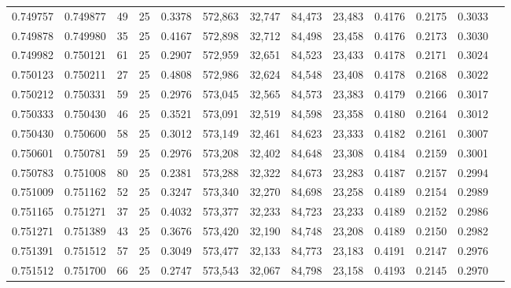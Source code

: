 \begin{tabular}{rrrrrrrrrrrrr}
0.749757 & 0.749877 &    49 &  25 &                                     0.3378 & 572,863 &  32,747 &  84,473 &  23,483 & 0.4176 & 0.2175 & 0.3033 \\
0.749878 & 0.749980 &    35 &  25 &                                     0.4167 & 572,898 &  32,712 &  84,498 &  23,458 & 0.4176 & 0.2173 & 0.3030 \\
0.749982 & 0.750121 &    61 &  25 &                                     0.2907 & 572,959 &  32,651 &  84,523 &  23,433 & 0.4178 & 0.2171 & 0.3024 \\
0.750123 & 0.750211 &    27 &  25 &                                     0.4808 & 572,986 &  32,624 &  84,548 &  23,408 & 0.4178 & 0.2168 & 0.3022 \\
0.750212 & 0.750331 &    59 &  25 &                                     0.2976 & 573,045 &  32,565 &  84,573 &  23,383 & 0.4179 & 0.2166 & 0.3017 \\
0.750333 & 0.750430 &    46 &  25 &                                     0.3521 & 573,091 &  32,519 &  84,598 &  23,358 & 0.4180 & 0.2164 & 0.3012 \\
0.750430 & 0.750600 &    58 &  25 &                                     0.3012 & 573,149 &  32,461 &  84,623 &  23,333 & 0.4182 & 0.2161 & 0.3007 \\
0.750601 & 0.750781 &    59 &  25 &                                     0.2976 & 573,208 &  32,402 &  84,648 &  23,308 & 0.4184 & 0.2159 & 0.3001 \\
0.750783 & 0.751008 &    80 &  25 &                                     0.2381 & 573,288 &  32,322 &  84,673 &  23,283 & 0.4187 & 0.2157 & 0.2994 \\
0.751009 & 0.751162 &    52 &  25 &                                     0.3247 & 573,340 &  32,270 &  84,698 &  23,258 & 0.4189 & 0.2154 & 0.2989 \\
0.751165 & 0.751271 &    37 &  25 &                                     0.4032 & 573,377 &  32,233 &  84,723 &  23,233 & 0.4189 & 0.2152 & 0.2986 \\
0.751271 & 0.751389 &    43 &  25 &                                     0.3676 & 573,420 &  32,190 &  84,748 &  23,208 & 0.4189 & 0.2150 & 0.2982 \\
0.751391 & 0.751512 &    57 &  25 &                                     0.3049 & 573,477 &  32,133 &  84,773 &  23,183 & 0.4191 & 0.2147 & 0.2976 \\
0.751512 & 0.751700 &    66 &  25 &                                     0.2747 & 573,543 &  32,067 &  84,798 &  23,158 & 0.4193 & 0.2145 & 0.2970 \\

\end{tabular}
